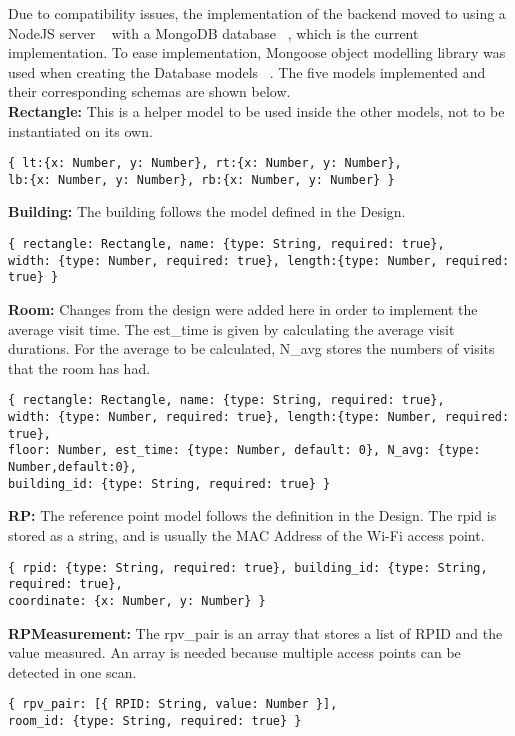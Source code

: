 Due to compatibility issues, the implementation of the backend moved to using a NodeJS server ~\cite{NodeJS} with a MongoDB database ~\cite{MongoDB}, which is the current implementation.
To ease implementation, Mongoose object modelling library was used when creating the Database models ~\cite{Mongoose}. The five models implemented and their corresponding schemas are shown below. 
\\
\textbf{Rectangle:}
This is a helper model to be used inside the other models, not to be instantiated on its own.
\begin{lstlisting}
{ lt:{x: Number, y: Number}, rt:{x: Number, y: Number}, 
lb:{x: Number, y: Number}, rb:{x: Number, y: Number} }	
\end{lstlisting}

\noindent
\textbf{Building:}
The building follows the model defined in the Design. 
\begin{lstlisting}
{ rectangle: Rectangle, name: {type: String, required: true},
width: {type: Number, required: true}, length:{type: Number, required: true} }
\end{lstlisting}

\noindent
\textbf{Room:}
Changes from the design were added here in order to implement the average visit time. The est\_time is given by calculating the average visit durations. For the average to be calculated, N\_avg stores the numbers of visits that the room has had.
\begin{lstlisting}
{ rectangle: Rectangle, name: {type: String, required: true},
width: {type: Number, required: true}, length:{type: Number, required: true},
floor: Number, est_time: {type: Number, default: 0}, N_avg: {type: Number,default:0},
building_id: {type: String, required: true} }
\end{lstlisting}

\noindent
\textbf{RP:}
The reference point model follows the definition in the Design. The rpid is stored as a string, and is usually the MAC Address of the Wi-Fi access point.
\begin{lstlisting}
{ rpid: {type: String, required: true}, building_id: {type: String, required: true},
coordinate: {x: Number, y: Number} }
\end{lstlisting}

\noindent
\textbf{RPMeasurement:}
The rpv\_pair is an array that stores a list of RPID and the value measured. An array is needed because multiple access points can be detected in one scan. 
\begin{lstlisting}
{ rpv_pair: [{ RPID: String, value: Number }], 
room_id: {type: String, required: true} }
\end{lstlisting}

